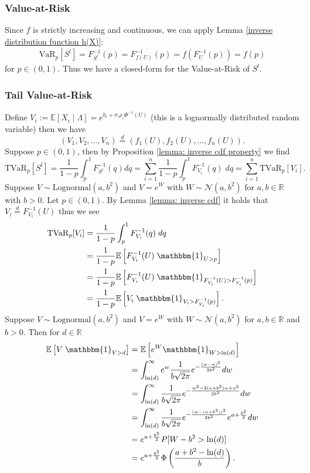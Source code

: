 \documentclass{article}
\begin{document}
\subsubsection{Value-at-Risk}
Since $f$ is strictly increasing and continuous, we can apply Lemma \ref{inverse distribution function h(X)}:
\begin{align*}
    \text{VaR}_p\left[S^l\right] = F_{S^l}^{-1}(p) = F_{f(U)}^{-1}(p) = f(F_U^{-1}(p)) = f(p)
\end{align*}
for $p\in (0,1)$. Thus we have a closed-form for the Value-at-Risk of $S^l$.
\subsubsection{Tail Value-at-Risk}
Define $V_i := \mathbb{E}[X_i\mid \Lambda] =  e^{b_i+ \sigma_i\rho_i\Phi^{-1}(U)}$ (this is a lognormally distributed random variable) then we have
$$(V_1,V_2,\dots,V_n) \overset{d}{=} (f_1(U),f_2(U),\dots,f_n(U)).$$
Suppose $p\in (0,1)$, then by Proposition \ref{lemma: inverse cdf property} we find
\begin{equation}\label{equation TVaR}
    \text{TVaR}_p\left[S^l\right] =  \frac{1}{1-p}\int_p^1F_{S^l}^{-1}(q)dq = \sum_{i=1}^n\frac{1}{1-p}\int_p^1F_{V_i}^{-1}(q)\;dq = \sum_{i=1}^n \text{TVaR}_p[V_i]. 
\end{equation}
Suppose $V\sim \text{Lognormal}(a,b^2)$ and $V = e^W$ with $W\sim \mathcal{N}(a,b^2)$ for $a,b\in \mathbb{R}$ with $b > 0$. Let $p\in (0,1)$. By Lemma \ref{lemma: inverse cdf} it holds that $V_i\overset{d}{=} F_{V_i}^{-1}(U)$ thus we see
\begin{align*}
	\text{TVaR}_p[V_i] &= \frac{1}{1-p}\int_p^1 F_{V_i}^{-1}(q)\;dq\\
    &= \frac{1}{1-p} \mathbb{E}\left[F_{V_i}^{-1}(U)\;\mathbbm{1}_{U > p}\right] \\
    &= \frac{1}{1-p} \mathbb{E}\left[F_{V_i}^{-1}(U)\;\mathbbm{1}_{F_{V_i}^{-1}(U) > F_{V_i}^{-1}(p)}\right] \\
    &=  \frac{1}{1-p} \mathbb{E}\left[V_i\;\mathbbm{1}_{V_i > F_{V_i}^{-1}(p)}\right].
\end{align*}
Suppose $V\sim \text{Lognormal}(a,b^2)$ and $V = e^W$ with $W \sim \mathcal{N}(a,b^2)$ for $a,b\in \mathbb{R}$ and $b> 0$. Then for $d\in \mathbb{R}$
\begin{align*}
	\mathbb{E}\left[V\;\mathbbm{1}_{V > d}\right] &= \mathbb{E}\left[e^W\mathbbm{1}_{W > \ln(d)}\right]\\
	&= \int_{\ln(d)}^\infty e^w \frac{1}{b\sqrt{2\pi}}e^{-\frac{(w-a)^2}{2b^2}}dw\\
	&= \int_{\ln(d)}^\infty \frac{1}{b\sqrt{2\pi}}e^{-\frac{w^2 - 2(a+b^2)w + a^2}{2b^2}}dw\\
	&=  \int_{\ln(d)}^\infty \frac{1}{b\sqrt{2\pi}}e^{-\frac{(w - (a + b^2))^2}{2b^2}}e^{a+\frac{b^2}{2}}dw\\
	&= e^{a+\frac{b^2}{2}} P[W - b^2 > \ln(d)]\\
	&= e^{a+\frac{b^2}{2}} \Phi\left(\frac{a + b^2 - \ln(d)}{b}\right).
\end{align*}
\end{document}
